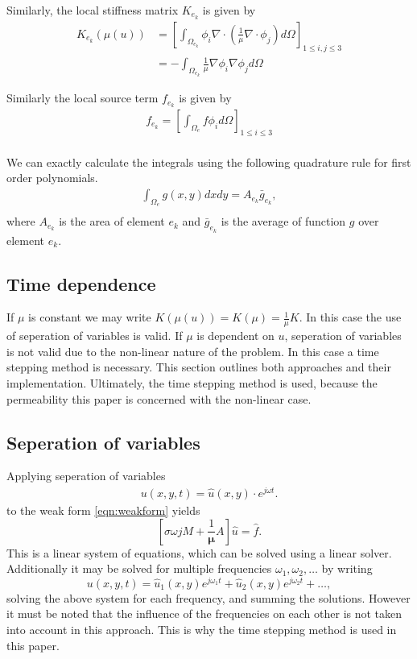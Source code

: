 \noindent Similarly, the local stiffness matrix $K_{e_k}$ is given by
\begin{align*}
    K_{e_k}(\mu(u)) &= \left[\int_{\Omega_{e_k}} \phi_i \nabla \cdot \left(\frac{1}{\mu} \nabla \cdot \phi_j \right) d \Omega \right]_{1 \leq i, j \leq 3} \\
    &= -\int_{\Omega_{e_k}} \frac{1}{\mu} \nabla \phi_i \nabla \phi_j d \Omega
\end{align*}

\noindent Similarly the local source term $f_{e_k}$ is given by
\begin{align*}
    f_{e_k} = \left[\int_{\Omega_e} f \phi_i d \Omega\right]_{1 \leq i \leq 3}\\
\end{align*}

\noindent We can exactly calculate the integrals using the following quadrature rule for first order polynomials.
\begin{align*}
    \int_{\Omega_e}g(x,y)dxdy = A_{e_k}\bar{g}_{e_k}, \\
\end{align*}
where $A_{e_k}$ is the area of element $e_k$ and $\bar{g}_{e_k}$ is the average of function $g$ over element $e_k$.



\subsection{Time dependence}
If $\mu$ is constant we may write $K(\mu(u)) = K(\mu) = \frac{1}{\mu}K$. In this case the use of seperation of variables is valid. 
If $\mu$ is dependent on $u$, seperation of variables is not valid due to the non-linear nature of the problem. 
In this case a time stepping method is necessary. This section outlines both approaches and their implementation.
Ultimately, the time stepping method is used, because the permeability this paper is concerned with the non-linear case.

\subsection{Seperation of variables}
Applying seperation of variables
\begin{align*}
    u(x,y,t) = \hat u(x,y) \cdot e^{j\omega t}.
\end{align*}
to the weak form \eqref{eqn:weakform} yields
\begin{equation*}
    \left[\sigma \omega j M + \frac{1}{\mathbf \mu}A\right]\hat u = \hat f.
\end{equation*}
This is a linear system of equations, which can be solved using a linear solver. 
Additionally it may be solved for multiple frequencies $\omega_1, \omega_2, \dots$ by writing
\begin{equation}
    u(x,y,t) = \hat u_1(x,y) e^{j\omega_1 t} + \hat u_2(x,y) e^{j\omega_2 t} + \dots,
\end{equation}
solving the above system for each frequency, and summing the solutions. However it must be noted that the influence of the frequencies on each other is not taken into account in this approach.
This is why the time stepping method is used in this paper.

